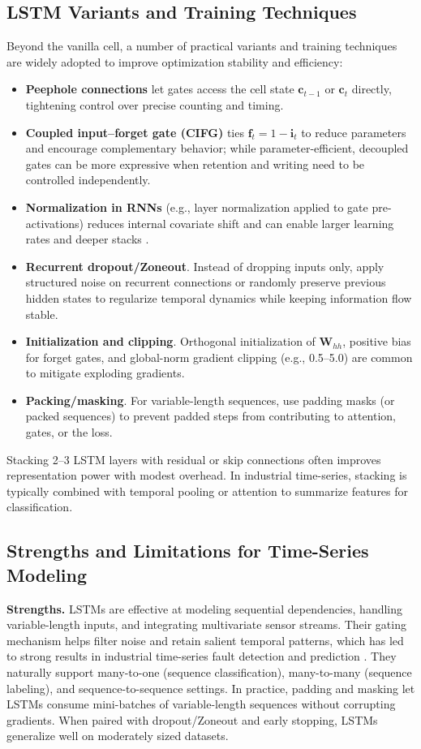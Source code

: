 \subsection{LSTM Variants and Training Techniques}
Beyond the vanilla cell, a number of practical variants and training techniques are widely adopted to improve optimization stability and efficiency:
\begin{itemize}
    \item \textbf{Peephole connections} let gates access the cell state \(\mathbf{c}_{t-1}\) or \(\mathbf{c}_t\) directly, tightening control over precise counting and timing.
    \item \textbf{Coupled input–forget gate (CIFG)} ties \(\mathbf{f}_t = 1-\mathbf{i}_t\) to reduce parameters and encourage complementary behavior; while parameter-efficient, decoupled gates can be more expressive when retention and writing need to be controlled independently.
    \item \textbf{Normalization in RNNs} (e.g., layer normalization applied to gate pre-activations) reduces internal covariate shift and can enable larger learning rates and deeper stacks \citep{ba2016layer}.
    \item \textbf{Recurrent dropout/Zoneout}. Instead of dropping inputs only, apply structured noise on recurrent connections or randomly preserve previous hidden states to regularize temporal dynamics while keeping information flow stable.
    \item \textbf{Initialization and clipping}. Orthogonal initialization of \(\mathbf{W}_{hh}\), positive bias for forget gates, and global-norm gradient clipping (e.g., 0.5--5.0) are common to mitigate exploding gradients.
    \item \textbf{Packing/masking}. For variable-length sequences, use padding masks (or packed sequences) to prevent padded steps from contributing to attention, gates, or the loss.
\end{itemize}
Stacking 2--3 LSTM layers with residual or skip connections often improves representation power with modest overhead. In industrial time-series, stacking is typically combined with temporal pooling or attention to summarize features for classification.

\subsection{Strengths and Limitations for Time-Series Modeling}
\textbf{Strengths.} LSTMs are effective at modeling sequential dependencies, handling variable-length inputs, and integrating multivariate sensor streams. Their gating mechanism helps filter noise and retain salient temporal patterns, which has led to strong results in industrial time-series fault detection and prediction \cite{filonov2016multivariateindustrialtimeseries, zhao2019deep}. They naturally support many-to-one (sequence classification), many-to-many (sequence labeling), and sequence-to-sequence settings. In practice, padding and masking let LSTMs consume mini-batches of variable-length sequences without corrupting gradients. When paired with dropout/Zoneout and early stopping, LSTMs generalize well on moderately sized datasets.

